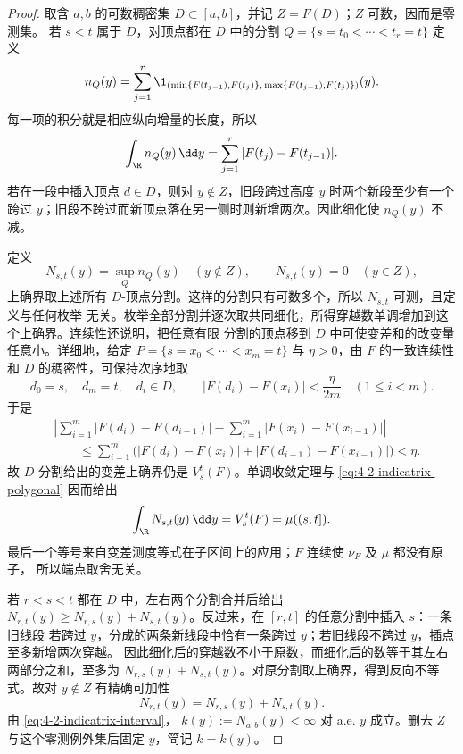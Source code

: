 \begin{proof}
取含 $a,b$ 的可数稠密集 $D\subset[a,b]$，并记 $Z=F(D)$；$Z$ 可数，因而是零测集。
若 $s<t$ 属于 $D$，对顶点都在 $D$ 中的分割
$Q=\{s=t_0<\cdots<t_r=t\}$ 定义
\[
 n_Q(y)=\sum_{j=1}^r
 \1_{(\min\{F(t_{j-1}),F(t_j)\},\,
          \max\{F(t_{j-1}),F(t_j)\})}(y).
\]
每一项的积分就是相应纵向增量的长度，所以
\begin{equation}\label{eq:4-2-indicatrix-polygonal}
 \int_\R n_Q(y)\,\dd y
 =\sum_{j=1}^r|F(t_j)-F(t_{j-1})|.
\end{equation}
若在一段中插入顶点 $d\in D$，则对 $y\notin Z$，旧段跨过高度 $y$ 时两个新段至少有一个跨过
$y$；旧段不跨过而新顶点落在另一侧时则新增两次。因此细化使 $n_Q(y)$ 不减。

定义
\[
 N_{s,t}(y)=\sup_Q n_Q(y)\quad(y\notin Z),\qquad N_{s,t}(y)=0\quad(y\in Z),
\]
上确界取上述所有 $D$-顶点分割。这样的分割只有可数多个，所以 $N_{s,t}$ 可测，且定义与任何枚举
无关。枚举全部分割并逐次取共同细化，所得穿越数单调增加到这个上确界。连续性还说明，把任意有限
分割的顶点移到 $D$ 中可使变差和的改变量任意小。详细地，给定
$P=\{s=x_0<\cdots<x_m=t\}$ 与 $\eta>0$，由 $F$ 的一致连续性和 $D$ 的稠密性，可保持次序地取
\[
 d_0=s,\quad d_m=t,\quad d_i\in D,\qquad
 |F(d_i)-F(x_i)|<\frac{\eta}{2m}\quad(1\le i<m).
\]
于是
\[
 \begin{aligned}
 &\left|\sum_{i=1}^m|F(d_i)-F(d_{i-1})|
       -\sum_{i=1}^m|F(x_i)-F(x_{i-1})|\right|\\
 &\qquad\le
 \sum_{i=1}^m\bigl(|F(d_i)-F(x_i)|
                   +|F(d_{i-1})-F(x_{i-1})|\bigr)<\eta.
 \end{aligned}
\]
故 $D$-分割给出的变差上确界仍是 $V_s^t(F)$。单调收敛定理与
\eqref{eq:4-2-indicatrix-polygonal} 因而给出
\begin{equation}\label{eq:4-2-indicatrix-interval}
 \int_\R N_{s,t}(y)\,\dd y=V_s^t(F)=\mu((s,t]).
\end{equation}
最后一个等号来自变差测度等式在子区间上的应用；$F$ 连续使 $\nu_F$ 及 $\mu$ 都没有原子，
所以端点取舍无关。

若 $r<s<t$ 都在 $D$ 中，左右两个分割合并后给出
$N_{r,t}(y)\ge N_{r,s}(y)+N_{s,t}(y)$。反过来，在 $[r,t]$ 的任意分割中插入 $s$：一条旧线段
若跨过 $y$，分成的两条新线段中恰有一条跨过 $y$；若旧线段不跨过 $y$，插点至多新增两次穿越。
因此细化后的穿越数不小于原数，而细化后的数等于其左右两部分之和，至多为
$N_{r,s}(y)+N_{s,t}(y)$。对原分割取上确界，得到反向不等式。故对 $y\notin Z$ 有精确可加性
\begin{equation}\label{eq:4-2-indicatrix-additivity}
 N_{r,t}(y)=N_{r,s}(y)+N_{s,t}(y).
\end{equation}
由 \eqref{eq:4-2-indicatrix-interval}，
$k(y):=N_{a,b}(y)<\infty$ 对 a.e. $y$ 成立。删去 $Z$ 与这个零测例外集后固定 $y$，简记
$k=k(y)$。


\end{proof}
